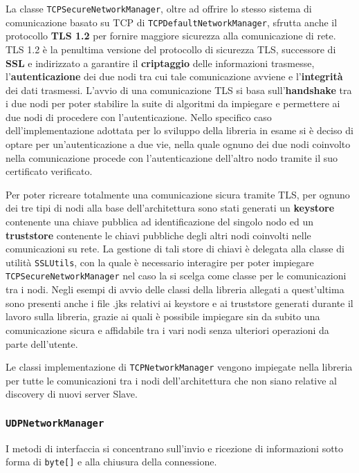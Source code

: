 La classe \texttt{TCPSecureNetworkManager}, oltre ad offrire lo stesso sistema di comunicazione basato su TCP di \texttt{TCPDefaultNetworkManager}, sfrutta anche il protocollo
\textbf{TLS 1.2} per fornire maggiore sicurezza alla comunicazione di rete. 
TLS 1.2 è la penultima versione del protocollo di sicurezza TLS, successore di \textbf{SSL} e indirizzato a garantire il \textbf{criptaggio} delle informazioni trasmesse,
l'\textbf{autenticazione} dei due nodi tra cui tale comunicazione avviene e l'\textbf{integrità} dei dati trasmessi.
L'avvio di una comunicazione TLS si basa sull'\textbf{handshake} tra i due nodi per poter stabilire la suite di algoritmi da impiegare e permettere ai due nodi di procedere con l'autenticazione.
Nello specifico caso dell'implementazione adottata per lo sviluppo della libreria in esame si è deciso di optare per un'autenticazione a due vie, nella quale ognuno dei due nodi coinvolto nella comunicazione
procede con l'autenticazione dell'altro nodo tramite il suo certificato verificato.

Per poter ricreare totalmente una comunicazione sicura tramite TLS, per ognuno dei tre tipi di nodi alla base dell'architettura sono stati generati un \textbf{keystore} contenente una chiave pubblica ad identificazione del singolo nodo ed un \textbf{truststore} contenente le chiavi pubbliche degli altri nodi coinvolti nelle comunicazioni su rete.
La gestione di tali store di chiavi è delegata alla classe di utilità \texttt{SSLUtils}, con la quale è necessario interagire per poter impiegare \texttt{TCPSecureNetworkManager} nel caso la si scelga come classe per le comunicazioni tra i nodi.
Negli esempi di avvio delle classi della libreria allegati a quest'ultima sono presenti anche i file .jks relativi ai keystore e ai truststore generati durante il lavoro sulla libreria, grazie ai quali è possibile impiegare sin da subito una comunicazione sicura e affidabile tra i vari nodi senza ulteriori operazioni da parte dell'utente.

Le classi implementazione di \texttt{TCPNetworkManager} vengono impiegate nella libreria per tutte le comunicazioni tra i nodi dell'architettura che non siano relative al discovery di nuovi server Slave.

\subsubsection{\texttt{UDPNetworkManager}}
I metodi di interfaccia si concentrano sull'invio e ricezione di informazioni sotto forma di \texttt{byte[]} e
alla chiusura della connessione. 

